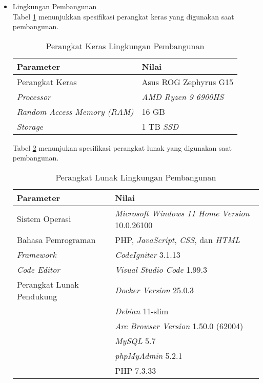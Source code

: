 \begin{itemize}
    \item Lingkungan Pembangunan \\
          Tabel \ref{tab:5:1:keraspembangunan} menunjukkan spesifikasi perangkat keras yang digunakan saat pembangunan.
          \begin{table}[H]
              \caption{Perangkat Keras Lingkungan Pembangunan}
              \label{tab:5:1:keraspembangunan}
              \centering
              \begin{tabular}{|l|l|}
                  \hline
                  \textbf{Parameter}                  & \textbf{Nilai}              \\ \hline
                  Perangkat Keras                     & Asus ROG Zephyrus G15       \\ \hline
                  \textit{Processor}                  & \textit{AMD Ryzen 9 6900HS} \\ \hline
                  \textit{Random Access Memory (RAM)} & 16 GB                       \\ \hline
                  \textit{Storage}                    & 1 TB \textit{SSD}           \\ \hline
              \end{tabular}
          \end{table}

          Tabel \ref{tab:5:1:lunakpembangunan} menunjukan spesifikasi perangkat lunak yang digunakan saat pembangunan.

          \begin{table}[H]
              \caption{Perangkat Lunak Lingkungan Pembangunan}
              \label{tab:5:1:lunakpembangunan}
              \centering
              \begin{tabular}{|l|l|}
                  \hline
                  \textbf{Parameter}        & \textbf{Nilai}                                            \\ \hline
                  Sistem Operasi            & \textit{Microsoft Windows 11 Home Version} 10.0.26100     \\ \hline
                  Bahasa Pemrograman        & PHP, \textit{JavaScript}, \textit{CSS}, dan \textit{HTML} \\ \hline
                  \textit{Framework}        & \textit{CodeIgniter} 3.1.13                               \\ \hline
                  \textit{Code Editor}      & \textit{Visual Studio Code} 1.99.3                        \\ \hline
                  Perangkat Lunak Pendukung & \textit{Docker Version} 25.0.3                            \\ & \textit{Debian} 11-slim \\ & \textit{Arc Browser Version} 1.50.0 (62004)\\ & \textit{MySQL} 5.7 \\ & \textit{phpMyAdmin} 5.2.1 \\ & PHP 7.3.33\\ \hline
              \end{tabular}
          \end{table}


\end{itemize}
